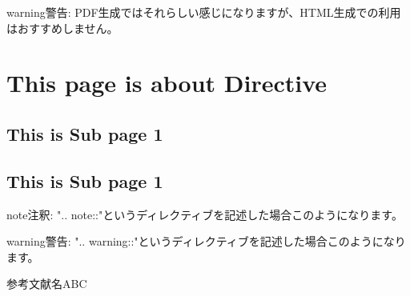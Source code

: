 \documentclass[letterpaper,10pt,dvipdfmx,openany,oneside]{sphinxmanual}
\begin{document}
\begin{sphinxadmonition}{warning}{警告:}
PDF生成ではそれらしい感じになりますが、HTML生成での利用はおすすめしません。
\end{sphinxadmonition}


\chapter{This page is about Directive}
\label{\detokenize{2.chapter/directive:this-page-is-about-directive}}\label{\detokenize{2.chapter/directive::doc}}

\section{This is Sub page 1}
\label{\detokenize{2.chapter/subpage/sub1:this-is-sub-page-1}}\label{\detokenize{2.chapter/subpage/sub1::doc}}

\section{This is Sub page 1}
\label{\detokenize{2.chapter/subpage/sub2:this-is-sub-page-1}}\label{\detokenize{2.chapter/subpage/sub2::doc}}
\begin{sphinxadmonition}{note}{注釈:}
".. note::"というディレクティブを記述した場合このようになります。
\end{sphinxadmonition}

\begin{sphinxadmonition}{warning}{警告:}
".. warning::"というディレクティブを記述した場合このようになります。
\end{sphinxadmonition}

\begin{sphinxthebibliography}{参考文献名ABC}
\end{sphinxthebibliography}



\renewcommand{\indexname}{索引}
\printindex
\end{document}
